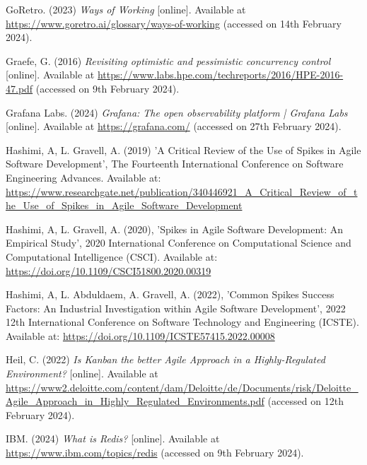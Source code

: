 \noindent GoRetro. (2023) \textit{Ways of Working} [online]. Available at \url{https://www.goretro.ai/glossary/ways-of-working} (accessed on 14th February 2024).
\vspace{0.2cm}

\noindent Graefe, G. (2016) \textit{Revisiting optimistic and pessimistic concurrency control} [online]. Available at \url{https://www.labs.hpe.com/techreports/2016/HPE-2016-47.pdf} (accessed on 9th February 2024).
\vspace{0.2cm}

\noindent Grafana Labs. (2024) \textit{Grafana: The open observability platform | Grafana Labs} [online]. Available at \url{https://grafana.com/} (accessed on 27th February 2024).
\vspace{0.2cm}

\noindent Hashimi, A, L. Gravell, A. (2019) 'A Critical Review of the Use of Spikes in Agile Software Development', The Fourteenth International Conference on Software Engineering Advances. Available at: \url{https://www.researchgate.net/publication/340446921_A_Critical_Review_of_the_Use_of_Spikes_in_Agile_Software_Development}
\vspace{0.2cm}

\noindent Hashimi, A, L. Gravell, A. (2020), 'Spikes in Agile Software Development: An Empirical Study', 2020 International Conference on Computational Science and Computational Intelligence (CSCI). Available at: \url{https://doi.org/10.1109/CSCI51800.2020.00319}
\vspace{0.2cm}

\noindent Hashimi, A, L. Abduldaem, A. Gravell, A. (2022), 'Common Spikes Success Factors: An Industrial Investigation within Agile Software Development', 2022 12th International Conference on Software Technology and Engineering (ICSTE). Available at: \url{https://doi.org/10.1109/ICSTE57415.2022.00008}
\vspace{0.2cm}

\noindent Heil, C. (2022) \textit{Is Kanban the better Agile Approach in a Highly-Regulated Environment?} [online]. Available at \url{https://www2.deloitte.com/content/dam/Deloitte/de/Documents/risk/Deloitte_Agile_Approach_in_Highly_Regulated_Environments.pdf} (accessed on 12th February 2024).
\vspace{0.2cm}

\noindent IBM. (2024) \textit{What is Redis?} [online]. Available at \url{https://www.ibm.com/topics/redis} (accessed on 9th February 2024).
\vspace{0.2cm}

